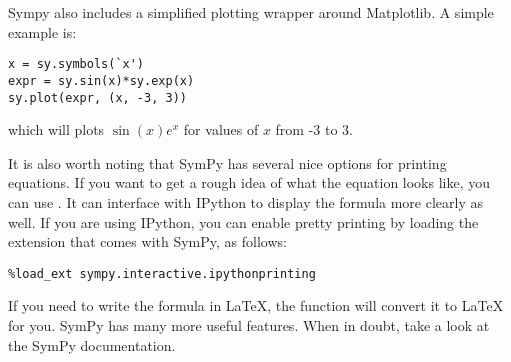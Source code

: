 Sympy also includes a simplified plotting wrapper around Matplotlib.
A simple example is:
\begin{lstlisting}
x = sy.symbols(`x')
expr = sy.sin(x)*sy.exp(x)
sy.plot(expr, (x, -3, 3))
\end{lstlisting}
which will plots $\sin\left(x\right) e^x$ for values of $x$ from -3 to 3.

It is also worth noting that SymPy has several nice options for printing equations.
If you want to get a rough idea of what the equation looks like, you can use .
It can interface with IPython to display the formula more clearly as well.
If you are using IPython, you can enable pretty printing by loading the extension that comes with SymPy, as follows:
\begin{lstlisting}
%load_ext sympy.interactive.ipythonprinting
\end{lstlisting}
If you need to write the formula in \LaTeX, the function  will convert it to \LaTeX{} for you.
SymPy has many more useful features.
When in doubt, take a look at the SymPy documentation.